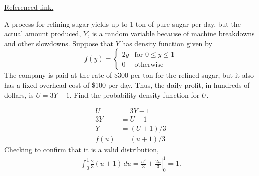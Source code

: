 \documentclass[answers]{exam}
\begin{document}
\begin{questions}
\begin{solution}
\href{https://en.wikipedia.org/wiki/List_of_integrals_of_exponential_functions#Definite_integrals}{Referenced link.}
\end{solution}

\question 
A process for refining sugar yields up to 1 ton of pure sugar per day, 
but the actual amount produced, \(Y\), is a random variable 
because of machine breakdowns and other slowdowns. 
Suppose that \(Y\) has density function given by
\[ f(y) = \begin{cases} 2y & \text{for } 0\leq y\leq1\\ 0 & \text{otherwise} \end{cases}\]
The company is paid at the rate of \$300 per ton for the refined sugar, 
but it also has a fixed overhead cost of \$100 per day. 
Thus, the daily profit, in hundreds of dollars, is \(U=3Y-1\). 
Find the probability density function for \(U\).
\begin{solution}
	\begin{align*}
		U &= 3Y-1 \\
		3Y &= U+1 \\
		Y &= (U+1)/3 \\
		f(u) &= (u+1)/3
	\end{align*}
	Checking to confirm that it is a valid distribution,
	\begin{align*}
		\int_{0}^{1} \frac{2}{3}(u+1)\, du 
		= \left. \frac{u^2}{3}+\frac{2u}{3} \right|_{0}^{1}
		= 1.
	\end{align*}
\end{solution}







\end{questions}
\end{document}
